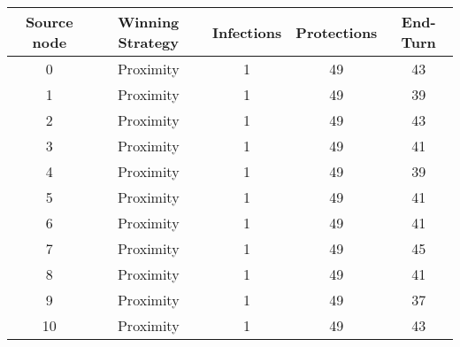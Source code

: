 \documentclass[results.tex]{subfiles}
\begin{document}
    \begin{center}
        \begin{tabular}{| c || c | c | c | c |}
            \hline
            {\bfseries Source node} & {\bfseries Winning Strategy} & {\bfseries Infections} & {\bfseries Protections}
            & {\bfseries End-Turn}
            \\  %
            \hline\hline
            0                       & Proximity                    & 1                      & 49                      & 43                   \\
            \hline
            1                       & Proximity                    & 1                      & 49                      & 39                   \\
            \hline
            2                       & Proximity                    & 1                      & 49                      & 43                   \\
            \hline
            3                       & Proximity                    & 1                      & 49                      & 41                   \\
            \hline
            4                       & Proximity                    & 1                      & 49                      & 39                   \\
            \hline
            5                       & Proximity                    & 1                      & 49                      & 41                   \\
            \hline
            6                       & Proximity                    & 1                      & 49                      & 41                   \\
            \hline
            7                       & Proximity                    & 1                      & 49                      & 45                   \\
            \hline
            8                       & Proximity                    & 1                      & 49                      & 41                   \\
            \hline
            9                       & Proximity                    & 1                      & 49                      & 37                   \\
            \hline
            10                      & Proximity                    & 1                      & 49                      & 43                   \\

\end{tabular}
\end{center}
\end{document}
